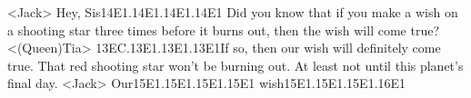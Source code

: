 <Jack> Hey, Sis{14}{E1}.{14}{E1}.{14}{E1}.{14}{E1} 
Did you know that if you make a wish on a shooting star three times before it 
burns out, then the wish will come true? 
<(Queen)Tia> {13}{EC}.{13}{E1}.{13}{E1}.{13}{E1}If so, then our wish will definitely come true. 
That red shooting star won't be burning out. 
At least not until this planet's final day. 
<Jack> Our{15}{E1}.{15}{E1}.{15}{E1}.{15}{E1} wish{15}{E1}.{15}{E1}.{15}{E1}.{16}{E1} 
